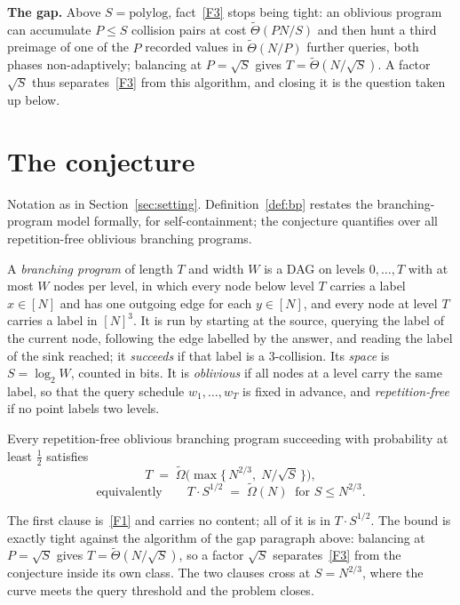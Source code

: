 \documentclass{aicr-conjecture}
\newcommand{\NN}{[N]}
\begin{document}
\smallskip
\noindent\textbf{The gap.}
Above $S = \mathrm{polylog}$, fact~\ref{F3} stops being tight: an oblivious program can
accumulate $P \leq S$ collision pairs at cost $\tilde\Theta(PN/S)$ and then hunt a third preimage
of one of the $P$ recorded values in $\tilde\Theta(N/P)$ further queries, both phases
non-adaptively; balancing at $P = \sqrt S$ gives $T = \tilde\Theta(N/\sqrt S)$.  A factor
$\sqrt S$ thus separates~\ref{F3} from this algorithm, and closing it is the question taken up
below.

\section{The conjecture}\label{sec:conjecture}

Notation as in Section~\ref{sec:setting}.  Definition~\ref{def:bp} restates the branching-program
model formally, for self-containment; the conjecture quantifies over all repetition-free
oblivious branching programs.

\begin{definition}\label{def:bp}
A \emph{branching program} of length $T$ and width $W$ is a DAG on levels $0,\dots,T$ with at
most $W$ nodes per level, in which every node below level $T$ carries a label $x \in \NN$ and has
one outgoing edge for each $y \in \NN$, and every node at level $T$ carries a label in $\NN^{3}$.
It is run by starting at the source, querying the label of the current node, following the edge
labelled by the answer, and reading the label of the sink reached; it \emph{succeeds} if that
label is a $3$-collision.  Its \emph{space} is $S = \log_{2} W$, counted in bits.  It is
\emph{oblivious} if all nodes at a level carry the same label, so that the query schedule
$w_{1},\dots,w_{T}$ is fixed in advance, and \emph{repetition-free} if no point labels two
levels.
\end{definition}

\begin{conjecture}[BS0$^{+}$: the oblivious sequential curve at $k=3$]\label{conj:main}
Every repetition-free oblivious branching program succeeding with probability at least $\tfrac12$
satisfies
\[
  T \;=\; \tilde\Omega\bigl(\max\{\, N^{2/3},\; N/\sqrt{S} \,\}\bigr),
\]
\[
  \text{equivalently} \qquad
  T \cdot S^{1/2} \;=\; \tilde\Omega(N) \ \text{ for } S \leq N^{2/3}.
\]
\end{conjecture}

\begin{remark}\label{rem:tightness}
The first clause is~\ref{F1} and carries no content; all of it is in $T \cdot S^{1/2}$.  The
bound is exactly tight against the algorithm of the gap paragraph above: balancing at
$P = \sqrt S$ gives $T = \tilde\Theta(N/\sqrt S)$, so a factor $\sqrt S$ separates~\ref{F3} from
the conjecture inside its own class.  The two clauses cross at $S = N^{2/3}$, where the curve
meets the query threshold and the problem closes.
\end{remark}
\end{document}
